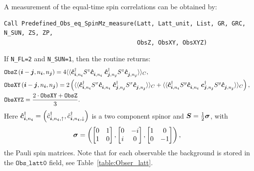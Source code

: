 A measurement of the equal-time spin correlations can be obtained by:
\begin{lstlisting}[style=fortran]
Call Predefined_Obs_eq_SpinMz_measure(Latt, Latt_unit, List, GR, GRC, N_SUN, ZS, ZP,
                                      ObsZ, ObsXY, ObsXYZ)
\end{lstlisting}
If \texttt{N\_FL=2} and \texttt{N\_SUN=1}, then the routine returns:
\begin{align}
&\texttt{ObsZ}\left(\ve{i}-\ve{j}, n_{\ve{i}},  n_{\ve{j}} \right)  =  \begin{multlined}[t]  4 \langle \langle \ve{\hat{c}}^{\dagger}_{\ve{i}, n_{\ve{i}}} S^z \ve{\hat{c}}^{\phantom\dagger}_{\ve{i}, n_{\ve{i}} }   \;  \ve{\hat{c}}^{\dagger}_{\ve{j}, n_{\ve{j}}} S^z  \ve{\hat{c}}^{\phantom\dagger}_{\ve{j}, n_{\ve{j}}}\rangle \rangle_{C},
\end{multlined} \nonumber \\  
&\texttt{ObsXY}\left(\ve{i}-\ve{j}, n_{\ve{i}},  n_{\ve{j}} \right)  =  2 \left( \langle \langle \ve{\hat{c}}^{\dagger}_{\ve{i}, n_{\ve{i}}} S^x \ve{\hat{c}}^{\phantom\dagger}_{\ve{i}, n_{\ve{i}} }   \;  \ve{\hat{c}}^{\dagger}_{\ve{j}, n_{\ve{j}}} S^x  
\ve{\hat{c}}^{\phantom\dagger}_{\ve{j}, n_{\ve{j}}}\rangle \rangle_{C}  +
\langle \langle \ve{\hat{c}}^{\dagger}_{\ve{i}, n_{\ve{i}}} S^y \ve{\hat{c}}^{\phantom\dagger}_{\ve{i}, n_{\ve{i}} }   \;  \ve{c}^{\dagger}_{\ve{j}, n_{\ve{j}}} S^y  \ve{\hat{c}}^{\phantom\dagger}_{\ve{j}, n_{\ve{j}}}\rangle \rangle_{C}  \right), \nonumber \\
&\texttt{ObsXYZ} =  \frac{2\cdot\texttt{ObsXY} + \texttt{ObsZ}}{3}.
\end{align}
Here  $\boldsymbol{\hat{c}}^{\dagger}_{\boldsymbol{i}, n_{\boldsymbol{i}}} =  \left( \hat{c}^{\dagger}_{\boldsymbol{i}, n_{\boldsymbol{i}},\uparrow},  \hat{c}^{\dagger}_{\boldsymbol{i}, n_{\boldsymbol{i}},\downarrow} \right) $ is a two component spinor and   $ \boldsymbol{S} = \frac{1}{2} \boldsymbol{\sigma}$, with
\begin{equation}
\boldsymbol{\sigma}   = \left(
\begin{bmatrix} 
0 & 1 \\
1 & 0 
\end{bmatrix},
\begin{bmatrix} 
0 & -i \\
i & 0 
\end{bmatrix},
\begin{bmatrix} 
1 & 0 \\
0 & -1 
\end{bmatrix}
\right), \label{eq:vecPaulimat}
\end{equation}
the Pauli spin  matrices. 
Note  that  for each observable the  background   is  stored  in the $\texttt{Obs\_latt0}$ field, see Table~\ref{table:Obser_latt}.

